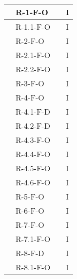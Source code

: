 \begin{center}
\begin{longtable}{ | C{2.5cm} |C{2cm} |C{7cm} |C{1.5cm}|}
                     & R-1-F-O            &                      & I              \\\hline
                     & R-1.1-F-O          &                      & I              \\\hline
                     & R-2-F-O            &                      & I              \\\hline
                     & R-2.1-F-O          &                      & I              \\\hline
                     & R-2.2-F-O          &                      & I              \\\hline
                     & R-3-F-O            &                      & I              \\\hline
                     & R-4-F-O            &                      & I              \\\hline
                     & R-4.1-F-D          &                      & I              \\\hline
                     & R-4.2-F-D          &                      & I              \\\hline
                     & R-4.3-F-O          &                      & I              \\\hline
                     & R-4.4-F-O          &                      & I              \\\hline
                     & R-4.5-F-O          &                      & I              \\\hline
                     & R-4.6-F-O          &                      & I              \\\hline
                     & R-5-F-O            &                      & I              \\\hline
                     & R-6-F-O            &                      & I              \\\hline
                     & R-7-F-O            &                      & I              \\\hline
                     & R-7.1-F-O          &                      & I              \\\hline
                     & R-8-F-D            &                      & I              \\\hline
                     & R-8.1-F-O          &                      & I              \\\hline

\end{longtable}
\end{center}
